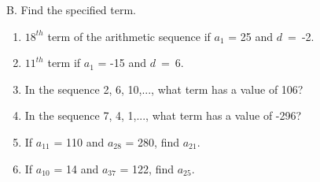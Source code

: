 B. Find the specified term.   
\begin{enumerate}
\item \hspce $18^{th}$ term of the arithmetic sequence if $a_{1}$ = 25 and $d$~=~-2.
\item \hspce $11^{th}$ term if $a_{1}$ = -15 and $d$~=~6.
\item \hspce In the sequence 2, 6, 10,..., what term has a value of 106?
\item \hspce In the sequence 7, 4, 1,...,  what term has a value of -296?
\item \hspce If $a_{11}$ = 110 and $a_{28}$ = 280, find $a_{21}$. 
\item \hspce If $a_{10}$ = 14 and $a_{37}$ = 122, find $a_{25}$. 
\end{enumerate}